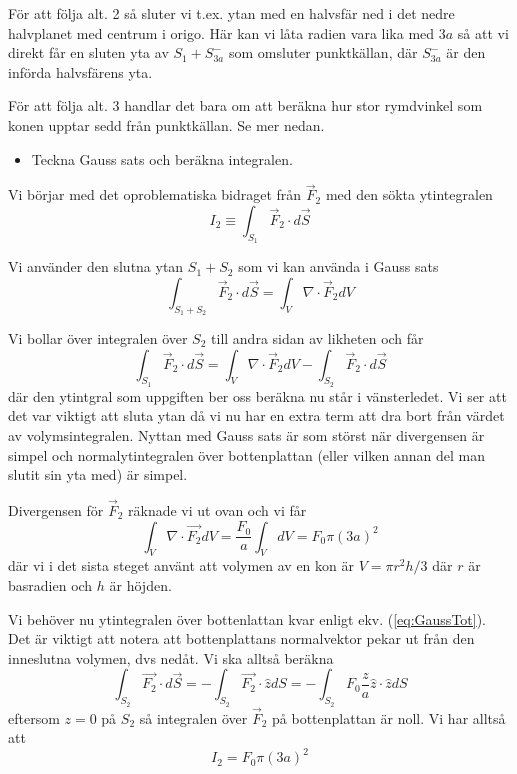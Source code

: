 \documentclass[%
oneside,                 %
final,                   %
10pt]{article}
\newenvironment{doconceexercise}{}{}
\begin{document}
\begin{doconceexercise}
För att följa alt. 2 så sluter vi t.ex. ytan med en halvsfär ned i det nedre halvplanet med centrum i origo. Här kan vi låta radien vara lika med $3a$ så att vi direkt får en sluten yta av $S_1 + S^-_{3a}$ som omsluter punktkällan, där $S^-_{3a}$ är den införda halvsfärens yta.

För att följa alt. 3 handlar det bara om att beräkna hur stor rymdvinkel som konen upptar sedd från punktkällan. Se mer nedan.

\begin{itemize}
\item Teckna Gauss sats och beräkna integralen.
\end{itemize}

\noindent
Vi börjar med det oproblematiska bidraget från $\vec{F}_2$ med den sökta ytintegralen
\begin{equation}
I_2 \equiv \int_{S_1} \vec{F}_2 \cdot d\vec{S}
\end{equation}

Vi använder den slutna ytan $S_1+S_2$ som vi kan använda i Gauss sats
\begin{equation}
\int_{S_1+S_2} \vec{F}_2 \cdot d\vec{S} = \int_V \nabla \cdot \vec{F}_2 dV 
\end{equation}

Vi bollar över integralen över $S_2$ till andra sidan av likheten och får
\begin{equation}
\label{eq:GaussTot}
\int_{S_1} \vec{F}_2 \cdot d\vec{S} = \int_V \nabla \cdot \vec{F}_2 dV - \int_{S_2} \vec{F}_2 \cdot d\vec{S}
\end{equation}
där den ytintgral som uppgiften ber oss beräkna nu står i vänsterledet. Vi ser att det var viktigt att sluta ytan då vi nu har en extra term att dra bort från värdet av volymsintegralen. Nyttan med Gauss sats är som störst när divergensen är simpel och normalytintegralen över bottenplattan (eller vilken annan del man slutit sin yta med) är simpel.

Divergensen för $\vec{F}_2$ räknade vi ut ovan och vi får
\begin{equation}
\int_V \nabla \cdot \vec{F_2} dV = \frac{F_0}{a} \int_V dV = F_0 \pi (3a)^2
\end{equation}
där vi i det sista steget använt att volymen av en kon är $V=\pi r^2 h/3$ där $r$ är basradien och $h$ är höjden. 

Vi behöver nu ytintegralen över bottenlattan kvar enligt ekv. (\ref{eq:GaussTot}). Det är viktigt att notera att bottenplattans normalvektor pekar ut från den inneslutna volymen, dvs nedåt. Vi ska alltså beräkna 
\begin{equation}
\int_{S_2} \vec{F_2} \cdot d\vec{S} = -\int_{S_2} \vec{F_2} \cdot \hat{z} dS= -\int_{S_2} F_0\frac{z}{a}\hat{z} \cdot \hat{z} dS
\end{equation}
eftersom $z=0$ på $S_2$ så integralen över $\vec{F}_2$ på bottenplattan är noll. Vi har alltså att
\begin{equation}
I_2 = F_0 \pi (3a)^2
\end{equation}


\end{doconceexercise}
\end{document}
